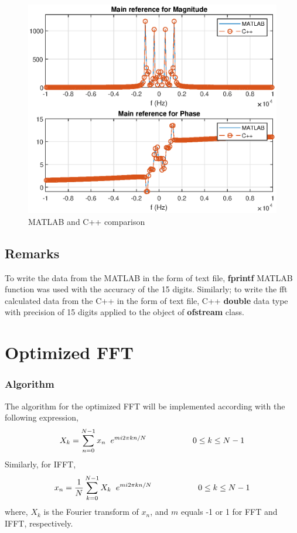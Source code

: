 \begin{figure}[h]
	\centering
	\includegraphics[width=12cm]{./algorithms/fft/figures/mixed_signal_fft.eps}
	\caption{MATLAB and C++ comparison}\label{mixed_signal_fft}
\end{figure}
\subsection*{Remarks}
To write the data from the MATLAB in the form of text file, \textbf{fprintf} MATLAB function was used with the accuracy of the 15 digits. Similarly; to write the fft calculated data from the C++ in the form of text file, C++ \textbf{double} data type with precision of 15 digits applied to the object of \textbf{ofstream} class.\
\section*{Optimized FFT}
\subsubsection{Algorithm}
The algorithm for the optimized FFT will be implemented according with the following expression,
\begin{equation}
X_k =\sum\limits_{n=0}^{N-1} x_n \hspace{2mm} e^{mi2\pi kn/N}		\hspace{2cm}	0\leq k \leq N-1
\label{optimized_FFT}
\end{equation}
Similarly, for IFFT,
\begin{equation}
x_n =\frac{1}{N} \sum\limits_{k=0}^{N-1} X_k \hspace{2mm}  e^{mi2\pi kn/N}		\hspace{2cm}	0\leq k \leq N-1
\label{optimized_IFFT}
\end{equation}
where, $X_k$ is the Fourier transform of $x_n$, and $m$ equals -1 or 1 for FFT and IFFT, respectively.

